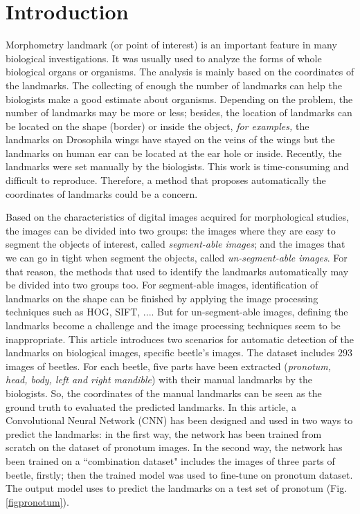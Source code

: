 \documentclass[10pt]{article}
\begin{document}
\section{Introduction}
Morphometry landmark (or point of interest) is an important feature in many biological investigations. It was usually used to analyze the forms of whole biological organs or organisms. The analysis is mainly based on the coordinates of the landmarks. The collecting of enough the number of landmarks can help the biologists make a good estimate about organisms. Depending on the problem, the number of landmarks may be more or less; besides, the location of landmarks can be located on the shape (border) or inside the object, \textit{for examples,} the landmarks on Drosophila wings have stayed on the veins of the wings but the landmarks on human ear can be located at the ear hole or inside. Recently, the landmarks were set manually by the biologists. This work is time-consuming and difficult to reproduce. Therefore, a method that proposes automatically the coordinates of landmarks could be a concern. 

Based on the characteristics of digital images acquired for morphological studies, the images can be divided into two groups: the images where they are easy to segment the objects of interest, called \textit{segment-able images}; and the images that we can go in tight when segment the objects, called \textit{un-segment-able images}. For that reason, the methods that used to identify the landmarks automatically may be divided into two groups too. For segment-able images, identification of landmarks on the shape can be finished by applying the image processing techniques such as HOG\cite{palaniswamy2010automatic}, SIFT\cite{lowe2004distinctive}, .... But for un-segment-able images, defining the landmarks become a challenge and the image processing techniques seem to be inappropriate. This article introduces two scenarios for automatic detection of the landmarks on biological images, specific beetle's images. The dataset includes $293$ images of beetles. For each beetle, five parts have been extracted (\textit{pronotum, head, body, left and right mandible}) with their manual landmarks by the biologists. So, the coordinates of the manual landmarks can be seen as the ground truth to evaluated the predicted landmarks.
In this article, a Convolutional Neural Network (CNN)\cite{lecun2010convolutional} has been designed and used in two ways to predict the landmarks: in the first way, the network has been trained from scratch on the dataset of pronotum images. In the second way, the network has been trained on a  ``combination dataset" includes the images of three parts of beetle, firstly; then the trained model was used to fine-tune \cite{yosinski2014transferable} on pronotum dataset. The output model uses to predict the landmarks on a test set of pronotum (Fig.\ref{figpronotum}). 
\end{document}
